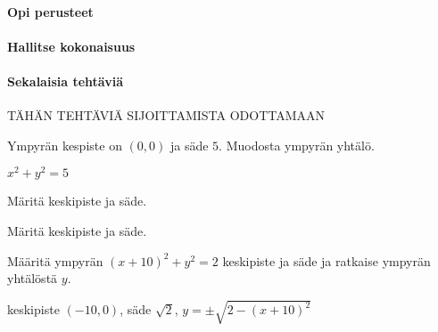 \begin{tehtavasivu}

\paragraph*{Opi perusteet}

\paragraph*{Hallitse kokonaisuus}

\paragraph*{Sekalaisia tehtäviä}

TÄHÄN TEHTÄVIÄ SIJOITTAMISTA ODOTTAMAAN

\begin{tehtava}
Ympyrän kespiste on $(0,0)$ ja säde $5$. Muodosta ympyrän yhtälö.
\begin{vastaus}
$x^2+y^2=5$
\end{vastaus}
\end{tehtava}

\begin{tehtava}
Märitä keskipiste ja säde.
\begin{alakohdat}
\end{alakohdat}
\begin{vastaus}
\begin{alakohdat}
\end{alakohdat}
\end{vastaus}
\end{tehtava}

\begin{tehtava}
Märitä keskipiste ja säde.
\begin{alakohdat}
\end{alakohdat}
\begin{vastaus}
\begin{alakohdat}
\end{alakohdat}
\end{vastaus}
\end{tehtava}

\begin{tehtava}
Määritä ympyrän $(x+10)^2+y^2=2$ keskipiste ja säde ja ratkaise ympyrän yhtälöstä $y$. 
\begin{vastaus}
keskipiste $(-10,0)$, säde $\sqrt{2}$, $y=\pm\sqrt{2-(x+10)^2}$ 
\end{vastaus}
\end{tehtava}


\end{tehtavasivu}
